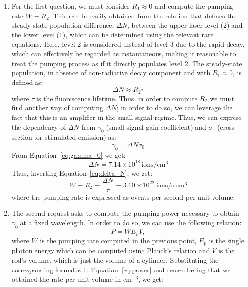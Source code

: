 \documentclass[prl, 11 pt]{revtex4-2}
\begin{document}
\begin{enumerate}
    \item For the first question, we must consider $R_1 \approx 0$ and compute the pumping rate $W = R_2$. This can be easily obtained from the relation that defines the steady-state population difference, $\Delta N$, between the upper laser level (2) and the lower level (1), which can be determined using the relevant rate equations. Here, level 2 is considered instead of level 3 due to the rapid decay, which can effectively be regarded as instantaneous, making it reasonable to treat the pumping process as if it directly populates level 2. The steady-state population, in absence of non-radiative decay component and with $R_1 \approx 0$, is defined as:
    \begin{equation}
        \label{eq:delta_N}
        \Delta N \approx R_2\tau
    \end{equation}
    where $\tau$ is the fluorescence lifetime. Thus, in order to compute $R_2$ we must find another way of computing $\Delta N$; in order to do so, we can leverage the fact that this is an amplifier in the small-signal regime. Thus, we can express the dependency of $\Delta N$ from $\gamma_0$ (small-signal gain coefficient) and $\sigma_0$ (cross-section for stimulated emission) as:
    \begin{equation}
        \label{eq:gamma_0}
        \gamma_0 = \Delta N \sigma_0
    \end{equation}
    From Equation~\eqref{eq:gamma_0} we get:
    $$
        \Delta N = 7.14 \times 10^{18}~\text{ions}/\si{\cm^{3}}
    $$
    Thus, inverting Equation~\eqref{eq:delta_N}, we get:
    $$
        W = R_2 = \frac{\Delta N}{\tau} = 3.10 \times 10^{22}~\text{ions}/\si{\second}\;\si{\cm^3}
    $$
    where the pumping rate is expressed as events per second per unit volume.
    \item The second request asks to compute the pumping power necessary to obtain $\gamma_0$ at a fixed wavelength. In order to do so, we can use the following relation:
    \begin{equation}
        \label{eq:power}
        P = W E_p V,
    \end{equation}
    where $W$ is the pumping rate computed in the previous point, $E_p$ is the single photon energy which can be computed using Planck's relation and $V$ is the rod's volume, which is just the volume of a cylinder. Substituting the corresponding formulas in Equation~\eqref{eq:power} and remembering that we obtained the rate per unit volume in $\si{\cm^{-3}}$, we get:

\end{enumerate}
\end{document}
